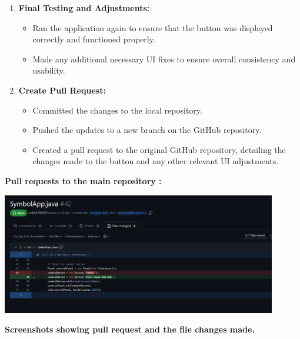 \documentclass[a4paper,12pt]{article}
\begin{document}
\begin{enumerate}
    \item \textbf{Final Testing and Adjustments:}
    \begin{itemize}
        \item Ran the application again to ensure that the button was displayed correctly and functioned properly.
        \item Made any additional necessary UI fixes to ensure overall consistency and usability.
    \end{itemize}

    \item \textbf{Create Pull Request:}
    \begin{itemize}
        \item Committed the changes to the local repository.
        \item Pushed the updates to a new branch on the GitHub repository.
        \item Created a pull request to the original GitHub repository, detailing the changes made to the button and any other relevant UI adjustments.
    \end{itemize}
\end{enumerate}
\par\vspace{5em}
\large\textbf{Pull requests to the main repository :}
\par\vspace{2em}
\includegraphics[width=0.9\textwidth]{ankit.png}
\par\vspace{2em}
\large\textbf{Screenshots showing pull request and the file changes made.}
\vspace{0.3in}
\newpage
\end{document}
